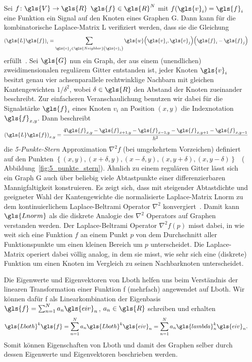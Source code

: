 Sei $f \colon \gls{V} \to \gls{R}$ \bzw{} $\gls{f} \in \gls{R}^N$ mit $f\left(\gls{v}_i\right) = \gls{f}_i$ eine Funktion \bzw{} ein Signal auf den Knoten eines Graphen \gls{G}.
Dann kann für die kombinatorische Laplace-Matrix \gls{L} verifiziert werden, dass sie die Gleichung
\begin{equation*}
  {\left(\gls{L}\gls{f}\right)}_i = \sum_{\gls{v}_j \in \gls{Neighbor}\left(\gls{v}_i\right)} \gls{w}\left(\gls{v}_i, \gls{v}_j\right) \left(\gls{f}_i - \gls{f}_j\right)
\end{equation*}
erfüllt~\cite{Hammond}.
Sei $\gls{G}$ nun ein Graph, der aus einem (unendlichen) zweidimensionalen regulärem Gitter entstanden ist, \dhe{} jeder Knoten $\gls{v}_i$ besitzt genau vier achsenparallele rechtwinklige Nachbarn mit gleichen Kantengewichten $1/\delta^2$, wobei $\delta \in \gls{R}$ den Abstand der Knoten zueinander beschreibt.
Zur einfacheren Veranschaulichung benutzen wir dabei für die Signalstärke $\gls{f}_i$ eines Knoten $v_i$ an Position $\left(x, y\right)$ die Indexnotation $\gls{f}_{x,y}$.
Dann beschreibt
\begin{equation*}
  {\left(\gls{L}\gls{f}\right)}_{x,y} = \frac{4\gls{f}_{x,y} - \gls{f}_{x+1,y} - \gls{f}_{x-1,y} - \gls{f}_{x,y+1} - \gls{f}_{x,y-1}}{h^2}
\end{equation*}
die \emph{5-Punkte-Stern} Approximation $\nabla^2 f$ (bei umgekehrtem Vorzeichen) definiert auf den Punkten $\left\{\left(x,y\right), \left(x+\delta,y\right), \left(x-\delta,y\right), \left(x,y + \delta\right),\left(x,y-\delta\right)\right\}$~\cite{Hammond} (\vgl{} Abbildung~\ref{fig:5_punkte_stern}).
Ähnlich zu einem regulären Gitter lässt sich ein Graph \gls{G} auch über beliebig viele Abtastpunkte einer differenzierbaren Mannigfaltigkeit konstruieren.
Es zeigt sich, dass mit steigender Abtastdichte und geeigneter Wahl der Kantengewichte die normalisierte Laplace-Matrix \gls{Lnorm} zu dem kontinuierlichem Laplace-Beltrami Operator $\nabla^2$ konvergiert~\cite{Hammond}.
Damit kann $\gls{Lnorm}$ als die diskrete Analogie des $\nabla^2$ Operators auf Graphen verstanden werden.
Der Laplace-Beltrami Operator $\nabla^2 f\left(p\right)$ misst dabei, in wie weit sich eine Funktion $f$ an einem Punkt $p$ von dem Durchschnitt aller Funktionspunkte um einen kleinen Bereich um $p$ unterscheidet.
Die Laplace-Matrix operiert dabei völlig analog, in dem sie misst, wie sehr sich eine (diskrete) Funktion um einen Knoten im Vergleich zu seinen Nachbarknoten unterscheidet.

Die Eigenwerte und Eigenvektoren von \gls{Lboth} helfen uns beim Verständnis der linearen Transformation einer Funktion \gls{f} (mehrfach) angewendet auf \gls{Lboth}.
Wir können dafür \gls{f} als Linearkombination der Eigenbasis $\gls{f} = \sum_{n=1}^N a_n \gls{eiv}_n$, $a_n \in \gls{R}$ schreiben und erhalten
\begin{equation*}
  \gls{Lboth}^k \gls{f} = \sum_{n=1}^N a_n \gls{Lboth}^k \gls{eiv}_n = \sum_{n=1}^N a_n \gls{lambda}_n^k \gls{eiv}_n.
\end{equation*}
Somit können Eigenschaften von \gls{Lboth} und damit des Graphen selber durch dessen Eigenwerte und Eigenvektoren beschrieben werden.

